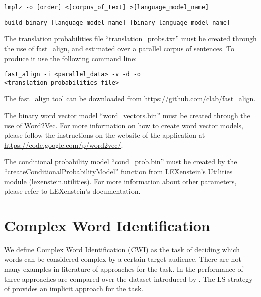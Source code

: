 \begin{lstlisting}
lmplz -o [order] <[corpus_of_text] >[language_model_name]
\end{lstlisting}
\begin{lstlisting}
build_binary [language_model_name] [binary_language_model_name]
\end{lstlisting}

The translation probabilities file ``translation\_probs.txt'' must be created through the use of fast\_align, and estimated over a parallel corpus of sentences. To produce it use the following command line:

\begin{lstlisting}
fast_align -i <parallel_data> -v -d -o <translation_probabilities_file>
\end{lstlisting}

The fast\_align tool can be downloaded from \url{https://github.com/clab/fast_align}.

The binary word vector model ``word\_vectors.bin'' must be created through the use of Word$2$Vec. For more information on how to create word vector models, please follow the instructions on the website of the application at \url{https://code.google.com/p/word2vec/}.

The conditional probability model ``cond\_prob.bin'' must be created by the ``createConditionalProbabilityModel'' function from LEXenstein's Utilities module (lexenstein.utilities). For more information about other parameters, please refer to LEXenstein's documentation.


























\section{Complex Word Identification}
\label{cwi}

We define Complex Word Identification (CWI) as the task of deciding which words can be considered complex by a certain target audience. There are not many examples in literature of approaches for the task. In \cite{Shardlow2013cwi} the performance of three approaches are compared over the dataset introduced by \cite{cwcorpus}. The LS strategy of \cite{Horn2014} provides an implicit approach for the task.

